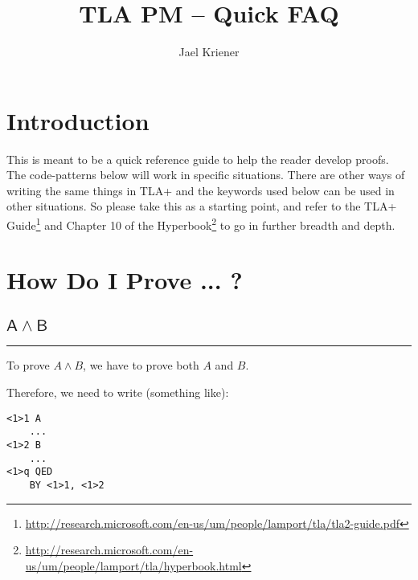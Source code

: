 \documentclass{article}
\title{TLA PM -- Quick FAQ}
\author{Jael Kriener}
\newcommand{\code}[1]{\mathsf{#1}}
\begin{document}
\maketitle



\section{Introduction}
This is meant to be a quick reference guide to help the reader 
develop proofs. The code-patterns below will work in specific 
situations. There are other ways of writing the same things in 
TLA+ and the keywords used below can be used in other situations.
So please take this as a starting point, and refer to the TLA+ Guide\footnote{ 
\url{http://research.microsoft.com/en-us/um/people/lamport/tla/tla2-guide.pdf}}
and Chapter 10 of the Hyperbook\footnote{\url{http://research.microsoft.com/en-us/um/people/lamport/tla/hyperbook.html}} to go in further breadth and depth.





\section{How Do I Prove ... ?}

\subsection{$\code{A \wedge B}$}
\hrule
\vspace{10pt}
\begin{minipage}{230pt}
To prove $A \wedge B$, we have to prove both $A$ and $B$. \\

\vspace{5pt}

Therefore, we need to write (something like):

\vspace{20pt}
\end{minipage}
%
\hspace{15pt} \vline \hspace{15pt}
%
\begin{minipage}{300pt}
\begin{verbatim}
<1>1 A
    ...
<1>2 B
    ...
<1>q QED
    BY <1>1, <1>2
\end{verbatim}
\end{minipage}
\end{document}
